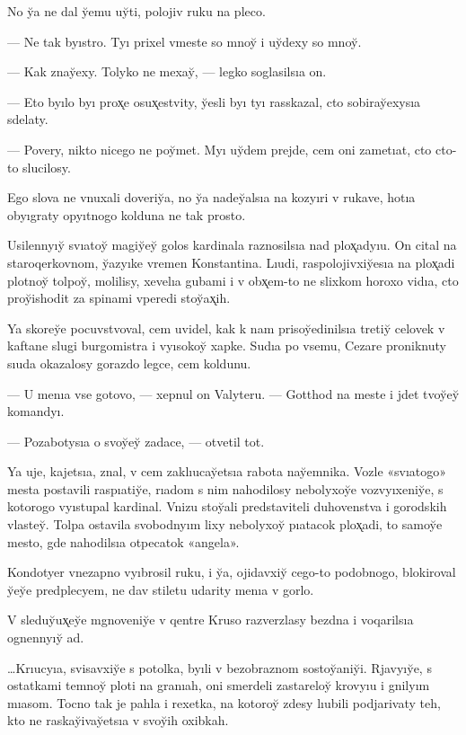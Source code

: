 \documentclass[10pt]{book}
\begin{document}
No y̆a ne dal y̆emu uy̆ti, polojiv ruku na pleco.

— Ne tak byıstro. Tyı prixel vmeste so mnoy̆ i uy̆dexy so mnoy̆.

— Kak znay̆exy. Tolyko ne mexay̆, — legko soglasilsıa on.

— Eto byılo byı prox̨e osux̨estvity, y̆esli byı tyı rasskazal, cto sobiray̆exysıa sdelaty.

— Povery, nikto nicego ne poy̆met. Myı uy̆dem prejde, cem oni zametıat, cto cto-to slucilosy.

Ego slova ne vnuxali doveriy̆a, no y̆a nadey̆alsıa na kozyıri v rukave, hotıa obyıgraty opyıtnogo kolduna ne tak prosto.

Usilennyıy̆ svıatoy̆ magiy̆ey̆ golos kardinala raznosilsıa nad plox̨adyıu. On cital na staroqerkovnom, y̆azyıke vremen Konstantina. Lıudi, raspolojivxiy̆esıa na plox̨adi plotnoy̆ tolpoy̆, molilisy, xevelıa gubami i v obx̨em-to ne slixkom horoxo vidıa, cto proy̆ishodit za spinami vperedi stoy̆ax̨ih.

Ya skorey̆e pocuvstvoval, cem uvidel, kak k nam prisoy̆edinilsıa tretiy̆ celovek v kaftane slugi burgomistra i vyısokoy̆ xapke. Sudıa po vsemu, Cezare proniknuty sıuda okazalosy gorazdo legce, cem koldunu.

— U menıa vse gotovo, — xepnul on Valyteru. — Gotthod na meste i jdet tvoy̆ey̆ komandyı.

— Pozabotysıa o svoy̆ey̆ zadace, — otvetil tot.

Ya uje, kajetsıa, znal, v cem zaklıucay̆etsıa rabota nay̆emnika. Vozle «svıatogo» mesta postavili raspıatiy̆e, rıadom s nim nahodilosy nebolyxoy̆e vozvyıxeniy̆e, s kotorogo vyıstupal kardinal. Vnizu stoy̆ali predstaviteli duhovenstva i gorodskih vlastey̆. Tolpa ostavila svobodnyım lixy nebolyxoy̆ pıatacok plox̨adi, to samoy̆e mesto, gde nahodilsıa otpecatok «angela».

Kondotyer vnezapno vyıbrosil ruku, i y̆a, ojidavxiy̆ cego-to podobnogo, blokiroval y̆ey̆e predplecyem, ne dav stiletu udarity menıa v gorlo.

V sleduy̆ux̨ey̆e mgnoveniy̆e v qentre Kruso razverzlasy bezdna i voqarilsıa ognennyıy̆ ad.



…Krıucyıa, svisavxiy̆e s potolka, byıli v bezobraznom sostoy̆aniy̆i. Rjavyıy̆e, s ostatkami temnoy̆ ploti na granıah, oni smerdeli zastareloy̆ krovyıu i gnilyım mıasom. Tocno tak je pahla i rexetka, na kotoroy̆ zdesy lıubili podjarivaty teh, kto ne raskay̆ivay̆etsıa v svoy̆ih oxibkah.
\end{document}
